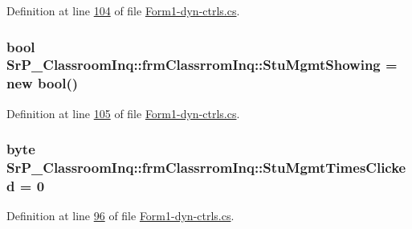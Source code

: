 \-Definition at line \hyperlink{_form1-dyn-ctrls_8cs_source_l00104}{104} of file \hyperlink{_form1-dyn-ctrls_8cs_source}{\-Form1-\/dyn-\/ctrls.\-cs}.

\hypertarget{class_sr_p___classroom_inq_1_1frm_classrrom_inq_a6a40312dc72ead57d8d40d415ee14a07}{
\subsubsection[{\-Stu\-Mgmt\-Showing}]{\setlength{\rightskip}{0pt plus 5cm}bool {\bf \-Sr\-P\-\_\-\-Classroom\-Inq\-::frm\-Classrrom\-Inq\-::\-Stu\-Mgmt\-Showing} = new bool()}}
\label{class_sr_p___classroom_inq_1_1frm_classrrom_inq_a6a40312dc72ead57d8d40d415ee14a07}


\-Definition at line \hyperlink{_form1-dyn-ctrls_8cs_source_l00105}{105} of file \hyperlink{_form1-dyn-ctrls_8cs_source}{\-Form1-\/dyn-\/ctrls.\-cs}.

\hypertarget{class_sr_p___classroom_inq_1_1frm_classrrom_inq_a8746b34d859922daf9b2d5b00cef317e}{
\subsubsection[{\-Stu\-Mgmt\-Times\-Clicked}]{\setlength{\rightskip}{0pt plus 5cm}byte {\bf \-Sr\-P\-\_\-\-Classroom\-Inq\-::frm\-Classrrom\-Inq\-::\-Stu\-Mgmt\-Times\-Clicked} = 0}}
\label{class_sr_p___classroom_inq_1_1frm_classrrom_inq_a8746b34d859922daf9b2d5b00cef317e}


\-Definition at line \hyperlink{_form1-dyn-ctrls_8cs_source_l00096}{96} of file \hyperlink{_form1-dyn-ctrls_8cs_source}{\-Form1-\/dyn-\/ctrls.\-cs}.

